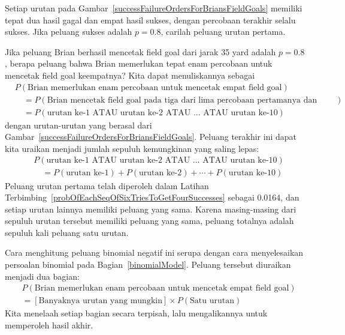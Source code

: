 \begin{exercisewrap}
\begin{nexercise} \label{probOfEachSeqOfSixTriesToGetFourSuccesses}
Setiap urutan pada Gambar~\ref{successFailureOrdersForBriansFieldGoals} memiliki tepat dua hasil gagal dan empat hasil sukses, dengan percobaan terakhir selalu sukses. Jika peluang sukses adalah $p=0.8$, carilah peluang urutan pertama.\footnotemark
\end{nexercise}
\end{exercisewrap}

\D{\newpage}

Jika peluang Brian berhasil mencetak field goal dari jarak 35 yard adalah $p=0.8$, berapa peluang bahwa Brian memerlukan tepat enam percobaan untuk mencetak field goal keempatnya? Kita dapat menuliskannya sebagai
{\small\begin{align*}
&P(\text{Brian memerlukan enam percobaan untuk mencetak empat field goal}) \\
& \quad = P(\text{Brian mencetak field goal pada tiga dari lima percobaan pertamanya dan pada percobaan keenam}) \\
& \quad = P(\text{urutan ke-$1$ ATAU urutan ke-$2$ ATAU ... ATAU urutan ke-$10$})
\end{align*}
}dengan urutan-urutan yang berasal dari Gambar~\ref{successFailureOrdersForBriansFieldGoals}. Peluang terakhir ini dapat kita uraikan menjadi jumlah sepuluh kemungkinan yang saling lepas:
{\small\begin{align*}
&P(\text{urutan ke-$1$ ATAU urutan ke-$2$ ATAU ... ATAU urutan ke-$10$}) \\
&\quad = P(\text{urutan ke-$1$}) + P(\text{urutan ke-$2$}) + \cdots + P(\text{urutan ke-$10$})
\end{align*}
}Peluang urutan pertama telah diperoleh dalam Latihan Terbimbing~\ref{probOfEachSeqOfSixTriesToGetFourSuccesses} sebagai 0.0164, dan setiap urutan lainnya memiliki peluang yang sama. Karena masing-masing dari sepuluh urutan tersebut memiliki peluang yang sama, peluang totalnya adalah sepuluh kali peluang satu urutan.

Cara menghitung peluang binomial negatif ini serupa dengan cara menyelesaikan persoalan binomial pada Bagian~\ref{binomialModel}. Peluang tersebut diuraikan menjadi dua bagian:
\begin{align*}
&P(\text{Brian memerlukan enam percobaan untuk mencetak empat field goal}) \\
&= [\text{Banyaknya urutan yang mungkin}] \times P(\text{Satu urutan})
\end{align*}
Kita menelaah setiap bagian secara terpisah, lalu mengalikannya untuk memperoleh hasil akhir.

